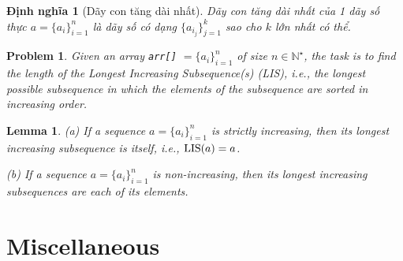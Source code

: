\documentclass{article}
\newtheorem{dinhnghia}{Định nghĩa}
\newtheorem{lemma}{Lemma}
\newtheorem{problem}{Problem}
\begin{document}
    \begin{dinhnghia}[Dãy con tăng dài nhất]
        {\rm Dãy con tăng dài nhất} của 1 dãy số thực $a = \{a_i\}_{i=1}^n$ là dãy số có dạng $\{a_{i_j}\}_{j=1}^k$ sao cho $k$ lớn nhất có thể.
    \end{dinhnghia}

    \begin{problem}
        Given an array {\tt arr[]} $= \{a_i\}_{i=1}^n$ of size $n\in\mathbb{N}^\star$, the task is to find the length of the Longest Increasing Subsequence(s) (LIS), i.e., the longest possible subsequence in which the elements of the subsequence are sorted in increasing order.
    \end{problem}

    \begin{lemma}
        (a) If a sequence $a = \{a_i\}_{i=1}^n$ is strictly increasing, then its longest increasing subsequence is itself, i.e., ${\rm LIS}(a) = a$.
        \item(b) If a sequence $a = \{a_i\}_{i=1}^n$ is  non-increasing, then its longest increasing subsequences are each of its elements.
    \end{lemma}


    \section{Miscellaneous}


    \printbibliography[heading=bibintoc]
\end{document}
